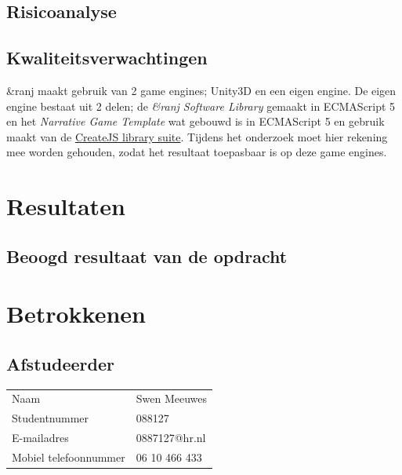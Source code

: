 \documentclass{report}
\makeatletter
\newcommand{\name}{Swen Meeuwes}
\newcommand{\studentnumber}{088127}
\newcommand{\email}{0887127@hr.nl}
\newcommand{\mobilephone}{06 10 466 433}
\newcommand{\organisation}{\&ranj }
\makeatother
\begin{document}

\section{Risicoanalyse}

\section{Kwaliteitsverwachtingen}
\organisation maakt gebruik van 2 game engines; Unity3D en een eigen engine. De eigen engine bestaat uit 2 delen; de \emph{\organisation Software Library} gemaakt in ECMAScript 5 en het \emph{Narrative Game Template} wat gebouwd is in ECMAScript 5 en gebruik maakt van de \href{https://createjs.com/}{CreateJS library suite}. Tijdens het onderzoek moet hier rekening mee worden gehouden, zodat het resultaat toepasbaar is op deze game engines.

\chapter{Resultaten}

\section{Beoogd resultaat van de opdracht}


\renewcommand{\bibname}{Literatuur}


\chapter{Betrokkenen}

\section*{Afstudeerder}
\begin{table}[h]
\begin{tabular}{ll}
Naam & \name \\
Studentnummer & \studentnumber \\
E-mailadres & \email \\
Mobiel telefoonnummer & \mobilephone
\end{tabular}
\end{table}
\end{document}
